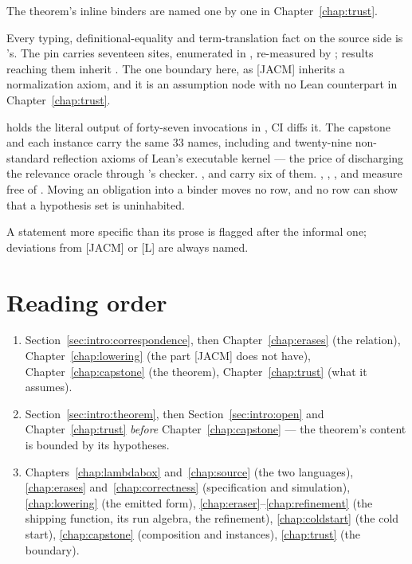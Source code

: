 \begin{description}
\par\smallskip\noindent
The theorem's inline binders are named one by one in Chapter~\ref{chap:trust}.
\item[\lead{The \code{lean4lean} trust boundary}] Every typing, definitional-equality and
term-translation fact on the source side is 's. The pin carries seventeen
 sites, enumerated in , re-measured by
; results reaching them inherit . The one
\stInherited{} boundary here, as [JACM] inherits a normalization axiom, and it is an assumption node
with no Lean counterpart in Chapter~\ref{chap:trust}.
\item[\lead{Measurement, not narration}]  holds the literal
 output of forty-seven invocations in , CI diffs it. The
capstone and each instance carry the same 33 names, including  and twenty-nine
non-standard reflection axioms of Lean's executable kernel --- the price of discharging the
relevance oracle through 's checker. ,
 and  carry six of them. ,
, ,  and
 measure free of . Moving an obligation into a binder moves no
row, and no row can show that a hypothesis set is uninhabited.
\item[\lead{One further rule}] A statement more specific than its prose is flagged after the
informal one; deviations from [JACM] or [L] are always named.
\end{description}

\section{Reading order}
\label{sec:intro:order}

\begin{enumerate}
\item {} Section~\ref{sec:intro:correspondence}, then
Chapter~\ref{chap:erases} (the relation), Chapter~\ref{chap:lowering} (the part [JACM] does not have),
Chapter~\ref{chap:capstone} (the theorem), Chapter~\ref{chap:trust} (what it assumes).
\item {} Section~\ref{sec:intro:theorem}, then
Section~\ref{sec:intro:open} and Chapter~\ref{chap:trust} \emph{before}
Chapter~\ref{chap:capstone} --- the theorem's content is bounded by its hypotheses.
\item {} Chapters~\ref{chap:lambdabox} and~\ref{chap:source} (the two
languages), \ref{chap:erases} and~\ref{chap:correctness} (specification and simulation),
\ref{chap:lowering} (the emitted form), \ref{chap:eraser}--\ref{chap:refinement} (the shipping
function, its run algebra, the refinement), \ref{chap:coldstart} (the cold start),
\ref{chap:capstone} (composition and instances), \ref{chap:trust} (the boundary).
\end{enumerate}


